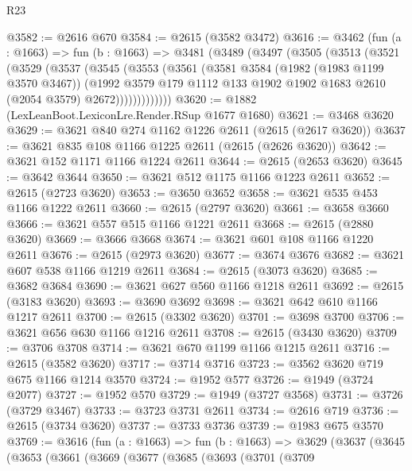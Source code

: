 \begin{lexlean}{R23}
\begin{coremodule}
@3582 := @2616 @670
@3584 := @2615 (@3582 @3472)
@3616 := @3462
    (fun (a : @1663) =>
    fun (b : @1663) =>
    @3481
      (@3489
        (@3497
          (@3505
            (@3513
              (@3521
                (@3529
                  (@3537
                    (@3545
                      (@3553
                        (@3561
                          (@3581
                            @3584
                            (@1982 (@1983 @1199 @3570 @3467))
                            (@1992
                              @3579
                              @179
                              @1112
                              @133
                              @1902
                              @1902
                              @1683
                              @2610
                              (@2054 @3579)
                              @2672)))))))))))))
@3620 := @1882 (LexLeanBoot.LexiconLre.Render.RSup @1677 @1680)
@3621 := @3468 @3620
@3629 := @3621 @840 @274 @1162 @1226 @2611 (@2615 (@2617 @3620))
@3637 := @3621 @835 @108 @1166 @1225 @2611 (@2615 (@2626 @3620))
@3642 := @3621 @152 @1171 @1166 @1224 @2611
@3644 := @2615 (@2653 @3620)
@3645 := @3642 @3644
@3650 := @3621 @512 @1175 @1166 @1223 @2611
@3652 := @2615 (@2723 @3620)
@3653 := @3650 @3652
@3658 := @3621 @535 @453 @1166 @1222 @2611
@3660 := @2615 (@2797 @3620)
@3661 := @3658 @3660
@3666 := @3621 @557 @515 @1166 @1221 @2611
@3668 := @2615 (@2880 @3620)
@3669 := @3666 @3668
@3674 := @3621 @601 @108 @1166 @1220 @2611
@3676 := @2615 (@2973 @3620)
@3677 := @3674 @3676
@3682 := @3621 @607 @538 @1166 @1219 @2611
@3684 := @2615 (@3073 @3620)
@3685 := @3682 @3684
@3690 := @3621 @627 @560 @1166 @1218 @2611
@3692 := @2615 (@3183 @3620)
@3693 := @3690 @3692
@3698 := @3621 @642 @610 @1166 @1217 @2611
@3700 := @2615 (@3302 @3620)
@3701 := @3698 @3700
@3706 := @3621 @656 @630 @1166 @1216 @2611
@3708 := @2615 (@3430 @3620)
@3709 := @3706 @3708
@3714 := @3621 @670 @1199 @1166 @1215 @2611
@3716 := @2615 (@3582 @3620)
@3717 := @3714 @3716
@3723 := @3562 @3620 @719 @675 @1166 @1214 @3570
@3724 := @1952 @577
@3726 := @1949 (@3724 @2077)
@3727 := @1952 @570
@3729 := @1949 (@3727 @3568)
@3731 := @3726 (@3729 @3467)
@3733 := @3723 @3731 @2611
@3734 := @2616 @719
@3736 := @2615 (@3734 @3620)
@3737 := @3733 @3736
@3739 := @1983 @675 @3570
@3769 := @3616
    (fun (a : @1663) =>
    fun (b : @1663) =>
    @3629
      (@3637
        (@3645
          (@3653
            (@3661
              (@3669
                (@3677
                  (@3685
                    (@3693
                      (@3701
                        (@3709

\end{coremodule}
\end{lexlean}
